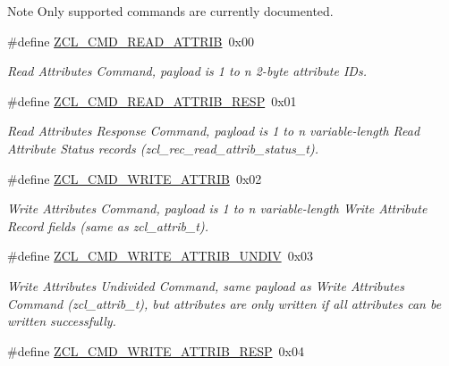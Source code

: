 \begin{DoxyNote}{Note}
Only supported commands are currently documented. 
\end{DoxyNote}
\begin{DoxyCompactItemize}
\item 
\mbox{\label{group__zcl_ga7a3d858b466e4202c6f2148a1b6a3eb2}} 
\#define \hyperlink{group__zcl_ga7a3d858b466e4202c6f2148a1b6a3eb2}{Z\+C\+L\+\_\+\+C\+M\+D\+\_\+\+R\+E\+A\+D\+\_\+\+A\+T\+T\+R\+IB}~0x00
\begin{DoxyCompactList}\small\item\em Read Attributes Command, payload is 1 to n 2-\/byte attribute I\+Ds. \end{DoxyCompactList}\item 
\#define \hyperlink{group__zcl_ga85ca2068c5dc26db307b60b0ac54bc9c}{Z\+C\+L\+\_\+\+C\+M\+D\+\_\+\+R\+E\+A\+D\+\_\+\+A\+T\+T\+R\+I\+B\+\_\+\+R\+E\+SP}~0x01
\begin{DoxyCompactList}\small\item\em Read Attributes Response Command, payload is 1 to n variable-\/length Read Attribute Status records (zcl\+\_\+rec\+\_\+read\+\_\+attrib\+\_\+status\+\_\+t). \end{DoxyCompactList}\item 
\#define \hyperlink{group__zcl_ga8843c2bcb861c091ae6f9a4e36f7e4d8}{Z\+C\+L\+\_\+\+C\+M\+D\+\_\+\+W\+R\+I\+T\+E\+\_\+\+A\+T\+T\+R\+IB}~0x02
\begin{DoxyCompactList}\small\item\em Write Attributes Command, payload is 1 to n variable-\/length Write Attribute Record fields (same as zcl\+\_\+attrib\+\_\+t). \end{DoxyCompactList}\item 
\#define \hyperlink{group__zcl_ga9d67bef86e1ec74d60c06e1a09cfb86a}{Z\+C\+L\+\_\+\+C\+M\+D\+\_\+\+W\+R\+I\+T\+E\+\_\+\+A\+T\+T\+R\+I\+B\+\_\+\+U\+N\+D\+IV}~0x03
\begin{DoxyCompactList}\small\item\em Write Attributes Undivided Command, same payload as Write Attributes Command (zcl\+\_\+attrib\+\_\+t), but attributes are only written if all attributes can be written successfully. \end{DoxyCompactList}\item 
\mbox{\label{group__zcl_ga0595c0f6957be4e80265ecd36158c0ae}} 
\#define \hyperlink{group__zcl_ga0595c0f6957be4e80265ecd36158c0ae}{Z\+C\+L\+\_\+\+C\+M\+D\+\_\+\+W\+R\+I\+T\+E\+\_\+\+A\+T\+T\+R\+I\+B\+\_\+\+R\+E\+SP}~0x04

\end{DoxyCompactItemize}

